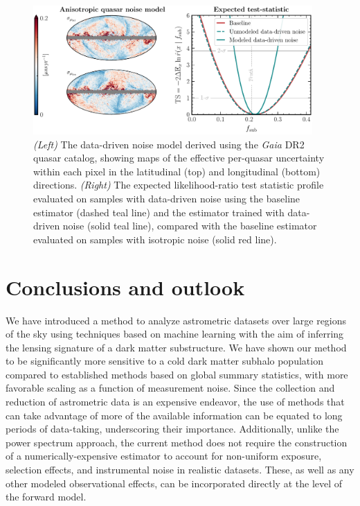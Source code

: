 \documentclass[twocolumn,linenumbers,anonymous]{aastex631}
\newcommand{\changes}[1]{{{\color{red}#1}}}
\begin{document}
\begin{figure}[!htbp]
\centering
\includegraphics[width=0.95\textwidth]{anisotropic_noise}
\caption{\changes{\emph{(Left)} The data-driven noise model derived using the \emph{Gaia} DR2 quasar catalog, showing maps of the effective per-quasar uncertainty within each pixel in the latitudinal (top) and longitudinal (bottom) directions. \emph{(Right)} The expected likelihood-ratio test statistic profile evaluated on samples with data-driven noise using the baseline estimator (dashed teal line) and the estimator trained with data-driven noise (solid teal line), compared with the baseline estimator evaluated on samples with isotropic noise (solid red line).}}
\label{fig:anisotropic_noise}
\end{figure}
    
\section{Conclusions and outlook}
\label{sec:conclusions}

We have introduced a method to analyze astrometric datasets over large regions of the sky using techniques based on machine learning with the aim of inferring the lensing signature of a dark matter substructure. We have shown our method to be significantly more sensitive to a cold dark matter subhalo population compared to established methods based on global summary statistics, with more favorable scaling as a function of measurement noise. Since the collection and reduction of astrometric data is an expensive endeavor, the use of methods that can take advantage of more of the available information can be equated to long periods of data-taking, underscoring their importance. Additionally, unlike the power spectrum approach, the current method does not require the construction of a numerically-expensive estimator to account for non-uniform exposure, selection effects, and instrumental noise in realistic datasets. These, as well as any other modeled observational effects, can be incorporated directly at the level of the forward model. 
\end{document}

